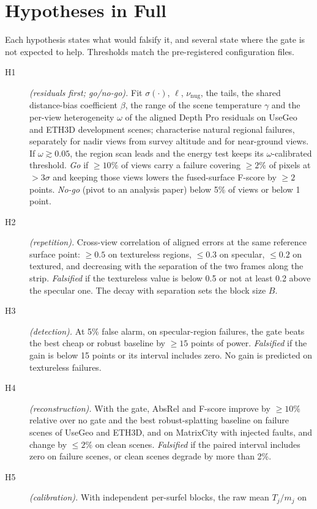\section{Hypotheses in Full}
\label{sup:hyp}
Each hypothesis states what would falsify it, and several state where the gate is not expected to
help. Thresholds match the pre-registered configuration files.
\begin{description}
  \item[H1] \emph{(residuals first; go/no-go).} Fit $\sigma(\cdot)$, $\ell$, $\nu_{\mathrm{nug}}$, the tails, the
        shared distance-bias coefficient $\beta$, the range of the scene temperature $\gamma$ and
        the per-view heterogeneity $\omega$ of the aligned Depth Pro residuals on UseGeo and ETH3D
        development scenes; characterise natural regional failures, separately for nadir views from
        survey altitude and for near-ground views. If $\omega\gtrsim0.05$, the region scan leads
        and the energy test keeps its $\omega$-calibrated threshold. \emph{Go} if $\ge10\%$ of views carry a failure covering $\ge2\%$ of pixels at
        $>3\sigma$ and keeping those views lowers the fused-surface F-score by $\ge2$ points.
        \emph{No-go} (pivot to an analysis paper) below 5\% of views or below 1 point.
  \item[H2] \emph{(repetition).} Cross-view correlation of aligned errors at the same reference
        surface point: $\ge0.5$ on textureless regions, $\le0.3$ on specular, $\le0.2$ on textured, and
        decreasing with the separation of the two frames along the strip. \emph{Falsified} if the
        textureless value is below 0.5 or not at least 0.2 above the specular one. The decay with
        separation sets the block size $B$.
  \item[H3] \emph{(detection).} At 5\% false alarm, on specular-region failures, the gate beats the
        best cheap or robust baseline by $\ge15$ points of power. \emph{Falsified} if the gain is
        below 15 points or its interval includes zero. No gain is predicted on textureless failures.
  \item[H4] \emph{(reconstruction).} With the gate, AbsRel and F-score improve by $\ge10\%$ relative
        over no gate and the best robust-splatting baseline on failure scenes of UseGeo and ETH3D, and
        on MatrixCity with injected faults,
        and change by $\le2\%$ on clean scenes. \emph{Falsified} if the paired interval includes zero
        on failure scenes, or clean scenes degrade by more than 2\%.
  \item[H5] \emph{(calibration).} With independent per-surfel blocks, the raw mean $T_j/m_j$ on

\end{description}

